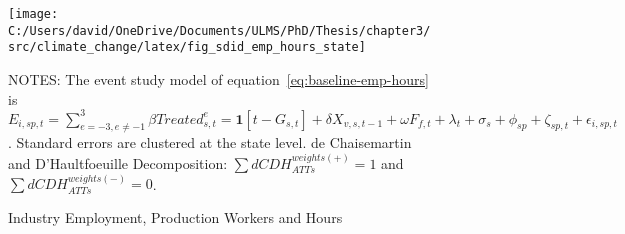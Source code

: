 \begin{figure}[H]
    \centering
    \texttt{[image: C:/Users/david/OneDrive/Documents/ULMS/PhD/Thesis/chapter3/src/climate\_change/latex/fig\_sdid\_emp\_hours\_state]}
    \caption{Industry Employment, Production Workers and Hours}
    \label{fig:baseline-employment-hours}
    \begin{minipage}{\columnwidth}
        \vspace{0.05in}
        \tiny NOTES: The event study model of equation~\ref{eq:baseline-emp-hours} is $E_{i,sp,t} = \sum_{{e = -3},{e \neq -1}}^{3} \beta Treated_{s,t}^e = \textbf{1}[t - G_{s,t}] + \delta X_{v,s,t-1} + \omega F_{f,t} + \lambda_{t} + \sigma_{s} + \phi_{sp} + \zeta_{sp,t} + \epsilon_{i,sp,t}$. Standard errors are clustered at the state level. de Chaisemartin and D'Haultfoeuille Decomposition: $\sum dCDH_{ATTs}^{weights(+)} = 1$ and $\sum dCDH_{ATTs}^{weights(-)} = 0$.
    \end{minipage}
\end{figure}